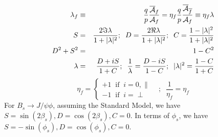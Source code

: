 \documentclass[a4paper,9pt,twoside]{article}
\begin{document}
\begin{eqnarray}
   \lambda_f &\equiv& \frac{q}{p}\frac{\overline{\cal A}_f}{{\cal A}_f} = \eta_f\frac{q}{p} \frac{\overline{\cal A}_{\overline{f}}}{{\cal A}_f} \equiv \eta_f \lambda\\
   S &=& \frac{2 \Im \lambda}{1+|\lambda|^2};\;\; D = \frac{2 \Re \lambda}{1+|\lambda|^2};\;\; C = \frac{1-|\lambda|^2 }{1+|\lambda|^2}\\
   D^2+S^2 & = & 1 - C^2 \\
   \lambda & = & \frac{D+iS}{1+C};\;\; \frac{1}{\lambda}  =  \frac{D-iS}{1-C};\;\; |\lambda|^2 = \frac{ 1-C }{ 1+C }
\end{eqnarray}
\begin{equation}
  \eta_f = \left\{ \begin{array}{l} +1 \;\; \mathrm{if}\;\; i=0,\parallel  \\ -1\;\; \mathrm{if}\;\; i=\perp \end{array} \right. \;\;\;;\;\; \frac{1}{\eta_f}=\eta_f
  \label{eq:etadef}
\end{equation}
For $B_s\rightarrow J/\psi\phi$, assuming the Standard Model,  we have $S=\sin(2\beta_s),D=\cos(2\beta_s),C=0$.
In terms of $\phi_s$, we have $S=-\sin(\phi_s),D=\cos(\phi_s),C=0$.
\end{document}
